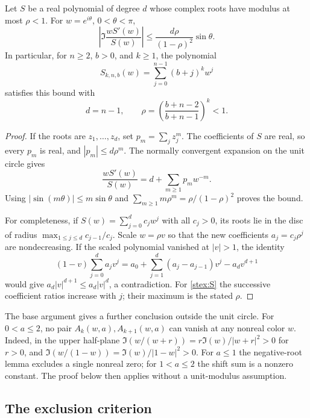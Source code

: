 \begin{lemma}
\label{stex:upper}
Let $S$ be a real polynomial of degree $d$ whose complex roots have
modulus at most $\rho<1$.  For $w=e^{i\theta}$, $0<\theta<\pi$,
\begin{equation}\label{stex:upper-formula}
 \left|\Im\frac{wS'(w)}{S(w)}\right|
       \le\frac{d\rho}{(1-\rho)^2}\sin\theta.
\end{equation}
In particular, for $n\ge2$, $b>0$, and $k\ge1$, the polynomial
\begin{equation}\label{stex:S}
 S_{k,n,b}(w)=\sum_{j=0}^{n-1}(b+j)^k w^j
\end{equation}
satisfies this bound with
\[
 d=n-1,\qquad
 \rho=\left(\frac{b+n-2}{b+n-1}\right)^k<1.
\]
\end{lemma}
\begin{proof}
If the roots are $z_1,\ldots,z_d$, set $p_m=\sum_jz_j^m$.
The coefficients of $S$ are real, so every $p_m$ is real, and
$|p_m|\le d\rho^m$.  The normally convergent expansion on the unit
circle gives
\[
 \frac{wS'(w)}{S(w)}=d+\sum_{m\ge1}p_m w^{-m}.
\]
Using $|\sin(m\theta)|\le m\sin\theta$ and
$\sum_{m\ge1}m\rho^m=\rho/(1-\rho)^2$ proves the bound.

For completeness, if $S(w)=\sum_{j=0}^d c_jw^j$ with all $c_j>0$,
its roots lie in the disc of radius $\max_{1\le j\le d}c_{j-1}/c_j$.
Scale $w=\rho v$ so that the new coefficients $a_j=c_j\rho^j$
are nondecreasing.  If the scaled polynomial vanished at $|v|>1$,
the identity
\[
 (1-v)\sum_{j=0}^d a_jv^j
    =a_0+\sum_{j=1}^d(a_j-a_{j-1})v^j-a_dv^{d+1}
\]
would give $a_d|v|^{d+1}\le a_d|v|^d$, a contradiction.
For \eqref{stex:S} the successive coefficient ratios increase with $j$;
their maximum is the stated $\rho$.
\end{proof}

The base argument gives a further conclusion outside the unit circle.
For $0<a\le2$, no pair $A_k(w,a),A_{k+1}(w,a)$ can vanish
at any nonreal color $w$. Indeed, in the upper half-plane
$\Im(w/(w+r))=r\Im(w)/|w+r|^2>0$ for $r>0$, and
$\Im(w/(1-w))=\Im(w)/|1-w|^2>0$. For $a\le1$ the
negative-root lemma excludes a single nonreal zero; for
$1<a\le2$ the shift sum is a nonzero constant. The proof
below then applies without a unit-modulus assumption.

\subsection{The exclusion criterion}

